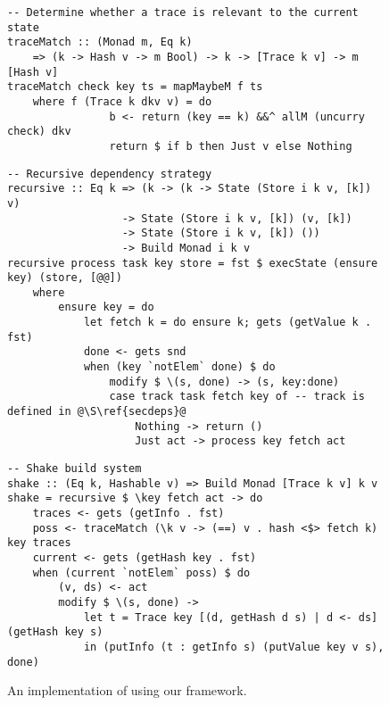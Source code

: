 \begin{figure}
\begin{verbatim}
-- Determine whether a trace is relevant to the current state
traceMatch :: (Monad m, Eq k)
    => (k -> Hash v -> m Bool) -> k -> [Trace k v] -> m [Hash v]
traceMatch check key ts = mapMaybeM f ts
    where f (Trace k dkv v) = do
                b <- return (key == k) &&^ allM (uncurry check) dkv
                return $ if b then Just v else Nothing
\end{verbatim}
\vspace{1mm}
\begin{verbatim}
-- Recursive dependency strategy
recursive :: Eq k => (k -> (k -> State (Store i k v, [k]) v)
                  -> State (Store i k v, [k]) (v, [k])
                  -> State (Store i k v, [k]) ())
                  -> Build Monad i k v
recursive process task key store = fst $ execState (ensure key) (store, [@@])
    where
        ensure key = do
            let fetch k = do ensure k; gets (getValue k . fst)
            done <- gets snd
            when (key `notElem` done) $ do
                modify $ \(s, done) -> (s, key:done)
                case track task fetch key of -- track is defined in @\S\ref{secdeps}@
                    Nothing -> return ()
                    Just act -> process key fetch act
\end{verbatim}
\vspace{1mm}
\begin{verbatim}
-- Shake build system
shake :: (Eq k, Hashable v) => Build Monad [Trace k v] k v
shake = recursive $ \key fetch act -> do
    traces <- gets (getInfo . fst)
    poss <- traceMatch (\k v -> (==) v . hash <$> fetch k) key traces
    current <- gets (getHash key . fst)
    when (current `notElem` poss) $ do
        (v, ds) <- act
        modify $ \(s, done) ->
            let t = Trace key [(d, getHash d s) | d <- ds] (getHash key s)
            in (putInfo (t : getInfo s) (putValue key v s), done)

\end{verbatim}
\vspace{-3mm}
\caption{An implementation of \Shake using our framework.}\label{fig-shake-implementation}
\vspace{1mm}
\end{figure}

\vspace{-2mm}
\subsection{\Bazel}\label{sec-implementation-bazel}
\vspace{-1mm}

